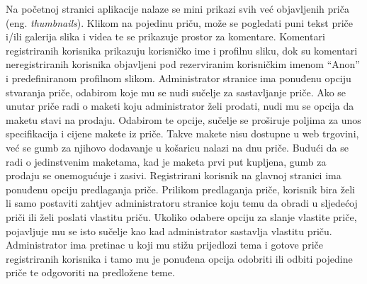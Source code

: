 		Na početnoj stranici aplikacije nalaze se mini prikazi svih već objavljenih priča (eng. \textit{thumbnails}). Klikom na pojedinu priču, može se pogledati puni tekst priče i/ili galerija slika i videa te se prikazuje prostor za komentare. Komentari registriranih korisnika prikazuju korisničko ime i profilnu sliku, dok su komentari neregistriranih korisnika objavljeni pod rezerviranim korisničkim imenom “Anon” i predefiniranom profilnom slikom. Administrator stranice ima ponuđenu opciju stvaranja priče, odabirom koje mu se nudi sučelje za sastavljanje priče. Ako se unutar priče radi o maketi koju administrator želi prodati, nudi mu se opcija da maketu stavi na prodaju. Odabirom te opcije, sučelje se proširuje poljima za unos specifikacija i cijene makete iz priče. Takve makete nisu dostupne u web trgovini, već se gumb za njihovo dodavanje u košaricu nalazi na dnu priče. Budući da se radi o jedinstvenim maketama, kad je maketa prvi put kupljena, gumb za prodaju se onemogućuje i zasivi. Registrirani korisnik na glavnoj stranici ima ponuđenu opciju predlaganja priče. Prilikom predlaganja priče, korisnik bira želi li samo postaviti zahtjev administratoru stranice koju temu da obradi u sljedećoj priči ili želi poslati vlastitu priču. Ukoliko odabere opciju za slanje vlastite priče, pojavljuje mu se isto sučelje kao kad administrator sastavlja vlastitu priču. Administrator ima pretinac u koji mu stižu prijedlozi tema i gotove priče registriranih korisnika i tamo mu je ponuđena opcija odobriti ili odbiti pojedine priče te odgovoriti na predložene teme. 
		
